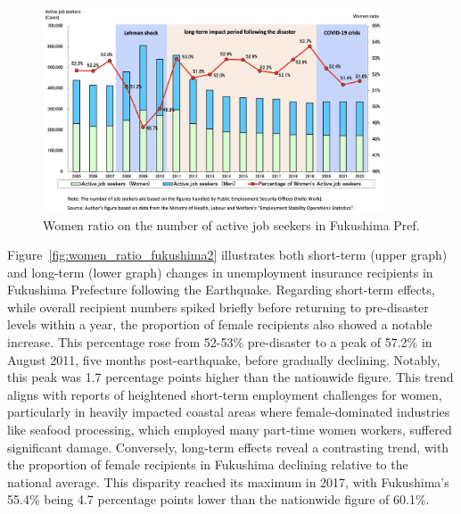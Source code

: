 \documentclass[a4paper,12pt]{article}
\begin{document}
\begin{figure}[h!]
    \centering
    \includegraphics[width=0.9\textwidth]{Women ratio on the number of active job seekers2.jpeg}  %
    \caption{Women ratio on the number of active job seekers in Fukushima Pref.}
    \label{fig:women_ratio_fukushima}
\end{figure}

\clearpage

Figure~\ref{fig:women_ratio_fukushima2} illustrates both short-term (upper graph) and long-term (lower graph) changes in unemployment insurance recipients in Fukushima Prefecture following the Earthquake. Regarding short-term effects, while overall recipient numbers spiked briefly before returning to pre-disaster levels within a year, the proportion of female recipients also showed a notable increase. This percentage rose from 52-53\% pre-disaster to a peak of 57.2\% in August 2011, five months post-earthquake, before gradually declining. Notably, this peak was 1.7 percentage points higher than the nationwide figure. This trend aligns with reports of heightened short-term employment challenges for women, particularly in heavily impacted coastal areas where female-dominated industries like seafood processing, which employed many part-time women workers, suffered significant damage. Conversely, long-term effects reveal a contrasting trend, with the proportion of female recipients in Fukushima declining relative to the national average. This disparity reached its maximum in 2017, with Fukushima's 55.4\% being 4.7 percentage points lower than the nationwide figure of 60.1\%.
\end{document}
